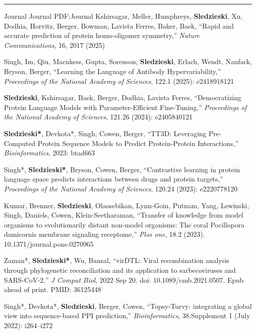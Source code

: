 \documentclass[letterpaper,MMMyyyy,nonstopmode]{simpleresumecv}
\begin{document}
\begin{Body}
\BigGap
\hrule
\Section
{Journal}
{Journal}
{PDF:Journal}
\Gap
\NumberedItem{[9]}
{{Kshirsagar, Meller, Humphreys, \textbf{Sledzieski}, Xu, Dodhia, Horvitz, Berger, Bowman, Lavista Ferres, Baker, Baek}, 
``Rapid and accurate prediction of protein homo-oligomer symmetry,'' 
 \textit{Nature Communications}, 16, 2017 (2025)
}

\Gap
\NumberedItem{[8]}
{{Singh, Im, Qiu, Macnkess, Gupta, Sorenson, \textbf{Sledzieski}, Erlach, Wendt, Nanfack, Bryson, Berger}, 
``Learning the Language of Antibody Hypervariability,'' 
 \textit{Proceedings of the National Academy of Sciences}, 122.1 (2025): e2418918121
}

\Gap
\NumberedItem{[7]}
{{\textbf{Sledzieski}, Kshirsagar, Baek, Berger, Dodhia, Lavista Ferres}, 
``Democratizing Protein Language Models with Parameter-Efficient Fine-Tuning,'' 
 \textit{Proceedings of the National Academy of Sciences}, 121.26 (2024): e2405840121
}

\Gap
\NumberedItem{[6]}
{{\textbf{Sledzieski*}, Devkota*, Singh, Cowen, Berger}, 
``TT3D: Leveraging Pre-Computed Protein Sequence Models to Predict Protein-Protein Interactions,'' 
 \textit{Bioinformatics}, 2023: btad663
}

\Gap
\NumberedItem{[5]}
{{Singh*, \textbf{Sledzieski*}, Bryson, Cowen, Berger}, 
``Contrastive learning in protein language space predicts interactions between drugs and protein targets,'' 
 \textit{Proceedings of the National Academy of Sciences}, 120.24 (2023): e2220778120
}

\Gap
\NumberedItem{[4]}
{{Kumar, Brenner, \textbf{Sledzieski}, Olaosebikan, Lynn-Goin, Putnam, Yang, Lewinski, Singh, Daniels, Cowen, Klein-Seetharaman}, 
``Transfer of knowledge from model organisms to evolutionarily distant non-model organisms: The coral Pocillopora damicornis membrane signaling receptome,'' 
 \textit{Plos one}, 18.2 (2023). 10.1371/journal.pone.0270965
}

\Gap
\NumberedItem{[3]}
{{Zaman*, \textbf{Sledzieski*}, Wu, Bansal}, 
``virDTL: Viral recombination analysis through phylogenetic reconciliation and its application to sarbecoviruses and SARS-CoV-2,'' 
 \textit{J Comput Biol}, 2022 Sep 20. doi: 10.1089/cmb.2021.0507. Epub ahead of print. PMID: 36125448
}

\Gap
\NumberedItem{[2]}
{{Singh*, Devkota*, \textbf{Sledzieski}, Berger, Cowen}, 
``Topsy-Turvy: integrating a global view into sequence-based PPI prediction,'' 
 \textit{Bioinformatics}, 38.Supplement 1 (July 2022): i264–i272
}


\end{Body}
\end{document}
